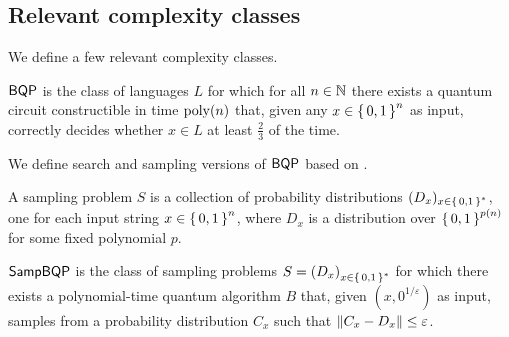 \subsection{Relevant complexity classes}

We define a few relevant complexity classes.

\begin{definition} [$\BQP$]
	$\BQP$ is the class of languages $L$ for which for all $n\in\mathbb{N}$ there exists a quantum circuit constructible in time $\operatorname*{\operatorname{poly}}(n)$ that, given any $x\in\set{0, 1}^n$ as input, correctly decides whether $x\in L$ at least $\frac{2}{3}$ of the time.
\end{definition}

\iffalse

\begin{definition} [$\FBQP$]
	A function $f:\set{0,1}^*\rightarrow\set{0,1}^*$ is in $\FBQP$ if there is a $\BQP$ machine that, $\forall x$, outputs $f(x)$ with overwhelming probability.
	\Ethan{Need to be more formal. Also should be efficient verifiable}
\end{definition}

\fi

We define search and sampling versions of $\BQP$ based on \cite{aaronson_2013}.

\iffalse

\begin{definition} [search problem]
	A search problem $R$ is a collection of nonempty sets $(A_x)_{x\in\set{0, 1}^*}$, one for each input string $x\in\set{0, 1}^*$, where $A_x$... \Ethan{Great, interface doesn't line up correctly}
\end{definition}

\fi

\begin{definition} 
	A sampling problem $S$ is a collection of probability distributions $(D_x)_{x\in\set{0, 1}^*}$, one for each input string $x\in\set{0,1}^n$, where $D_x$ is a distribution over $\set{0,1}^{p(n)}$ for some fixed polynomial $p$.
\end{definition}

\begin{definition} [$\SampBQP$]
	$\SampBQP$ is the class of sampling problems $S=\left(D_x\right)_{x\in\set{0, 1}^*}$ for which there exists a polynomial-time quantum algorithm $B$ that, given $(x, 0^{1/\varepsilon})$ as input, samples from a probability distribution $C_x$ such that $\left\lVert C_x-D_x\right\rVert\leq\varepsilon$.
\end{definition}

